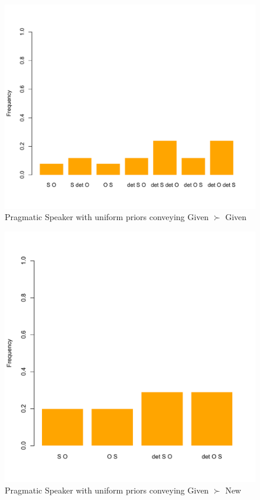\documentclass[output=paper,modfonts,nonflat]{langsci/langscibook}
\begin{document}
\begin{figure}
\includegraphics[scale = 0.45]{figures/plotPragmaticSpeakerGivenGivenUniform}
\caption{\small Pragmatic Speaker with uniform priors conveying Given $\succ$ Given}\label{figure:uniform2}
\end{figure}

\begin{figure}
\includegraphics[scale = 0.45]{figures/plotPragmaticSpeakerGivenNewUniform}
\caption{Pragmatic Speaker with uniform priors conveying Given $\succ$ New}\label{figure:uniform3}
\end{figure}
\end{document}
